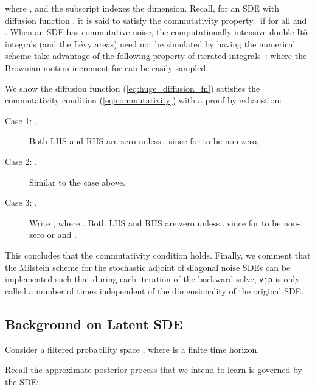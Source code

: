 \documentclass[twoside]{article}
\begin{document}
where , and the subscript indexes the dimension. 
Recall, for an SDE with diffusion function , it is said to satisfy the commutativity property~\cite{rossler2004runge} if 
for all  and .
When an SDE has commutative noise, the computationally intensive double It\^o integrals (and the L\'evy areas) need not be simulated by having the numerical scheme take advantage of the following property of iterated integrals~\cite{ilie2015adaptive}:
where the Brownian motion increment  for  can be easily sampled.

We show the diffusion function (\ref{eq:huge_diffusion_fn}) satisfies the commutativity condition (\ref{eq:commutativity}) with a proof by exhaustion:
\begin{description}
    \item[Case 1: .] 
        Both LHS and RHS are zero unless , since for  to be non-zero, .
    \item[Case 2: .]
        Similar to the case above. 
    \item[Case 3: .] 
        Write , where . Both LHS and RHS are zero unless , since for  to be non-zero  or  and .
\end{description}
This concludes that the commutativity condition holds.
Finally, we comment that the Milstein scheme for the stochastic adjoint of diagonal noise SDEs can be implemented such that during each iteration of the backward solve, \texttt{vjp} is only called a number of times independent of the dimensionality of the original SDE. 
 \subsection{Background on Latent SDE} \label{app:latent_sde_bg}
Consider a filtered probability space , where  is a finite time horizon.


Recall the approximate posterior process that we intend to learn is governed by the SDE:
\end{document}
